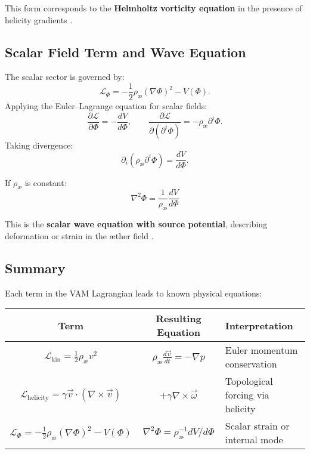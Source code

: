 This form corresponds to the \textbf{Helmholtz vorticity equation} in the presence of helicity gradients \cite{moffatt1969}.

\subsection*{Scalar Field Term and Wave Equation}

The scalar sector is governed by:
\[
    \mathcal{L}_\Phi = - \frac{1}{2} \rho_\text{\ae} (\nabla \Phi)^2 - V(\Phi).
\]
Applying the Euler–Lagrange equation for scalar fields:
\[
    \frac{\partial \mathcal{L}}{\partial \Phi} = - \frac{dV}{d\Phi}, \qquad
    \frac{\partial \mathcal{L}}{\partial (\partial^i \Phi)} = -\rho_\text{\ae} \partial^i \Phi.
\]
Taking divergence:
\[
    \partial_i ( \rho_\text{\ae} \partial^i \Phi ) = \frac{dV}{d\Phi}.
\]

If $\rho_\text{\ae}$ is constant:
\begin{equation}
    \boxed{
        \nabla^2 \Phi = \frac{1}{\rho_\text{\ae}} \frac{dV}{d\Phi}
    }
\end{equation}

This is the \textbf{scalar wave equation with source potential}, describing deformation or strain in the æther field \cite{barcelo2011}.

\subsection*{Summary}

Each term in the VAM Lagrangian leads to known physical equations:

\begin{center}
    \begin{tabular}{|c|c|l|}
        \hline
        Term & Resulting Equation & Interpretation \\
        \hline
        $ \mathcal{L}_{\text{kin}} = \frac{1}{2} \rho_\text{\ae} v^2 $ & $ \rho_\text{\ae} \frac{d \vec{v}}{dt} = -\nabla p $ & Euler momentum conservation \\
        $ \mathcal{L}_{\text{helicity}} = \gamma \vec{v} \cdot (\nabla \times \vec{v}) $ & $ +\gamma \nabla \times \vec{\omega} $ & Topological forcing via helicity \\
        $ \mathcal{L}_\Phi = -\frac{1}{2} \rho_\text{\ae} (\nabla \Phi)^2 - V(\Phi) $ & $ \nabla^2 \Phi = \rho_\text{\ae}^{-1} dV/d\Phi $ & Scalar strain or internal mode \\
        \hline
    \end{tabular}
\end{center}

